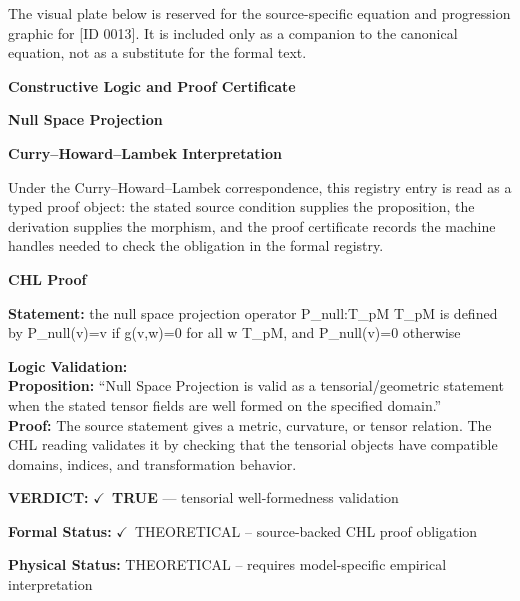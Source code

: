 \begingroup\footnotesize\sloppy
The visual plate below is reserved for the source-specific equation and progression graphic for [ID 0013]. It is included only as a companion to the canonical equation, not as a substitute for the formal text.
\par\endgroup
\ifTZPDarkEdition
{}
\fi

\clearpage
\begingroup\tzpsupportsetup
\noindent\textbf{\fontsize{10.8pt}{12.8pt}\selectfont [ID 0013] Constructive Logic and Proof Certificate}\par
\noindent\textbf{\fontsize{10pt}{12pt}\selectfont Null Space Projection}\par
\vspace{0.45em}
\begingroup
\footnotesize
\setlength{\parskip}{0.22em}
\setlength{\parindent}{0pt}
\noindent\textbf{Curry--Howard--Lambek Interpretation}\par
Under the Curry--Howard--Lambek correspondence, this registry entry is read as a typed proof
object: the stated source condition supplies the proposition, the derivation supplies the
morphism, and the proof certificate records the machine handles needed to check the obligation
in the formal registry.

\vspace{0.45em}
\noindent\textbf{CHL Proof}\par
\textbf{Statement:} the null space projection operator P\_null:T\_pM T\_pM is defined by P\_null(v)=v if
g(v,w)=0 for all w T\_pM, and P\_null(v)=0 otherwise

\textbf{Logic Validation:}\\
\textbf{Proposition:} ``Null Space Projection is valid as a tensorial/geometric statement when the stated tensor
fields are well formed on the specified domain.''\\
\textbf{Proof:} The source statement gives a metric, curvature, or tensor relation. The CHL reading
validates it by checking that the tensorial objects have compatible domains, indices,
and transformation behavior.

\textbf{VERDICT:} \ensuremath{\checkmark}\ \textbf{TRUE} --- tensorial well-formedness validation

\textbf{Formal Status:} \ensuremath{\checkmark}\ THEORETICAL -- source-backed CHL proof obligation

\textbf{Physical Status:} THEORETICAL -- requires model-specific empirical interpretation
\par\vspace{0.45em}
\par
\ifTZPDarkEdition
{}
\fi
\endgroup
\endgroup
